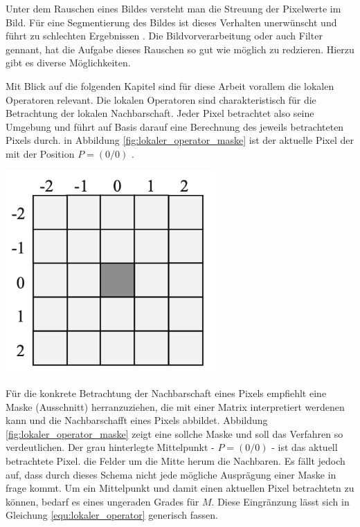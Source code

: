 Unter dem Rauschen eines Bildes versteht man die Streuung der Pixelwerte im Bild.
Für eine Segmentierung des Bildes ist dieses Verhalten unerwünscht und führt zu schlechten
Ergebnissen \citep[vgl.][Seite 51]{handels2000}. Die Bildvorverarbeitung oder
auch Filter gennant, hat die Aufgabe dieses Rauschen so gut wie möglich zu redzieren.
Hierzu gibt es diverse Möglichkeiten.

\begin{minipage}{0.40\textwidth}
	Mit Blick auf die folgenden Kapitel sind für diese Arbeit vorallem die lokalen
	Operatoren relevant. Die lokalen Operatoren sind charakteristisch für die
	Betrachtung der lokalen Nachbarschaft. Jeder Pixel betrachtet also seine Umgebung
	und führt auf Basis darauf eine Berechnung des jeweils betrachteten Pixels durch.
	in Abbildung \ref{fig:lokaler_operator_maske} ist der aktuelle Pixel der mit
	der Position $P = (0/0)$ \citep[vgl.][Seite 52]{handels2000}.
\end{minipage}
\hfill
\begin{minipage}{0.50\textwidth}
	\centering
	\includegraphics[width=0.60\textwidth]{img/lokaler_operator_maske.jpg}
	\label{fig:lokaler_operator_maske}
\end{minipage}

Für die konkrete Betrachtung der Nachbarschaft eines Pixels empfiehlt \citet[Seite
52]{handels2000} eine Maske (Ausschnitt) herranzuziehen, die mit einer Matrix
interpretiert werdenen kann und die Nachbarschafft eines Pixels abbildet. Abbildung
\ref{fig:lokaler_operator_maske} zeigt eine sollche Maske und soll das Verfahren
so verdeutlichen. Der grau hinterlegte Mittelpunkt - $P = (0/0)$ - ist das
aktuell betrachtete Pixel. die Felder um die Mitte herum die Nachbaren. Es fällt
jedoch auf, dass durch dieses Schema nicht jede mögliche Ausprägung einer Maske in
frage kommt. Um ein Mittelpunkt und damit einen aktuellen Pixel betrachtetn zu
können, bedarf es eines ungeraden Grades für $M$. Diese Eingränzung lässt sich
in Gleichung \ref{equ:lokaler_operator} generisch fassen.


